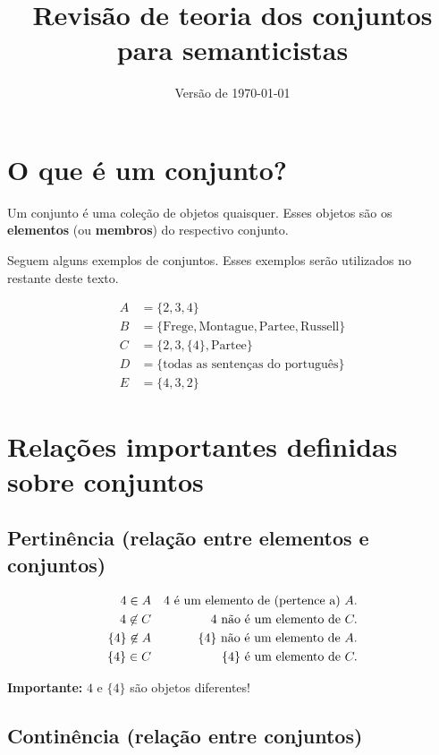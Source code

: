 \documentclass[11pt]{article}
\author{}
\date{Versão de \today}
\title{Revisão de teoria dos conjuntos para semanticistas}
\begin{document}
\maketitle

\section{O que é um conjunto?}
\label{sec:conjuntos}

Um conjunto é uma coleção de objetos quaisquer. Esses objetos são os \textbf{elementos} (ou \textbf{membros}) do respectivo conjunto.

Seguem alguns exemplos de conjuntos. Esses exemplos serão utilizados no restante deste texto.

\begin{align*}
  A & = \{2, 3, 4\}\\
  B &= \{\mathrm{Frege}, \mathrm{Montague}, \mathrm{Partee}, \mathrm{Russell}\}\\
  C &= \{2, 3, \{4\}, \mathrm{Partee}\}\\
  D &= \{\text{todas as sentenças do português}\}\\
  E &= \{4, 3, 2\}
\end{align*}

\section{Relações importantes definidas sobre conjuntos}
\label{sec:relacoes}

\subsection{Pertinência (relação entre elementos e conjuntos)}
\label{sec:pertinencia}

\begin{align*}
  4 \in A & \hspace*{\fill} & 4 \text{ é um elemento de (pertence a) } A.\\
  4 \not\in C & \hspace*{\fill} & 4 \text { não é um elemento de } C.\\
  \{4\} \not\in A & & \{4\}\text { não é um elemento de } A.\\
  \{4\} \in C & & \{4\}\text { é um elemento de } C.
\end{align*}

\textbf{Importante:} \(4\) e \(\{4\}\) são objetos diferentes!

\subsection{Continência (relação entre conjuntos)}
\label{sec:continencia}
\end{document}
